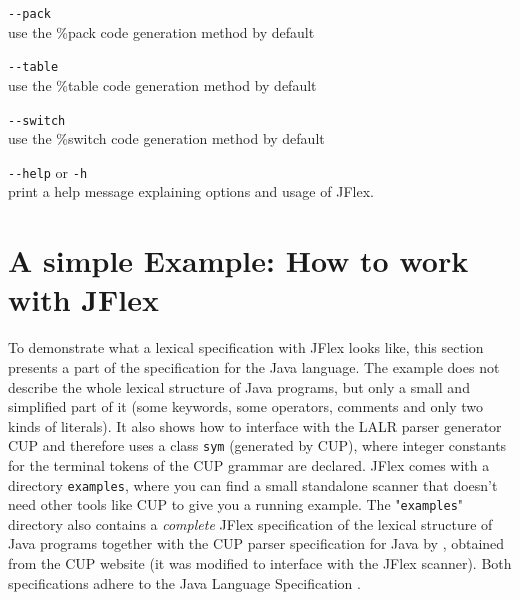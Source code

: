 \documentclass[11pt]{scrartcl}
\newcommand{\trit}{\em}
\begin{document}
\begin{description}
\item \verb+--pack+\\
  use the \%pack code generation method by default

\item \verb+--table+\\
  use the \%table code generation method by default

\item \verb+--switch+\\
  use the \%switch code generation method by default

\item \verb+--help+ or \texttt{-h}\\
  print a help message explaining options and usage of JFlex.
\end{description}

\section{A simple Example: How to work with JFlex\label{Example}}
To demonstrate what a lexical specification with JFlex looks like, this
section presents a part of the specification for the Java language.
The example does not describe the whole lexical structure of Java programs,
but only a small and simplified part of it (some keywords, some operators,
comments and only two kinds of literals). It also shows how to interface
with the LALR parser generator CUP \cite{CUP} and therefore
uses a class \texttt{sym} (generated by CUP), where integer constants for
the terminal tokens of the CUP grammar are declared. JFlex comes with a
directory \texttt{examples}, where you can find a small standalone scanner
that doesn't need other tools like CUP to give you a running example.
The "\texttt{examples}" directory also contains a {\trit complete} JFlex 
specification of the lexical structure of Java programs together with the 
CUP parser specification for Java by 
, obtained
from the CUP \cite{CUP} website (it was modified to interface with the JFlex scanner). 
Both specifications adhere to the Java Language Specification \cite{LangSpec}.
\end{document}
